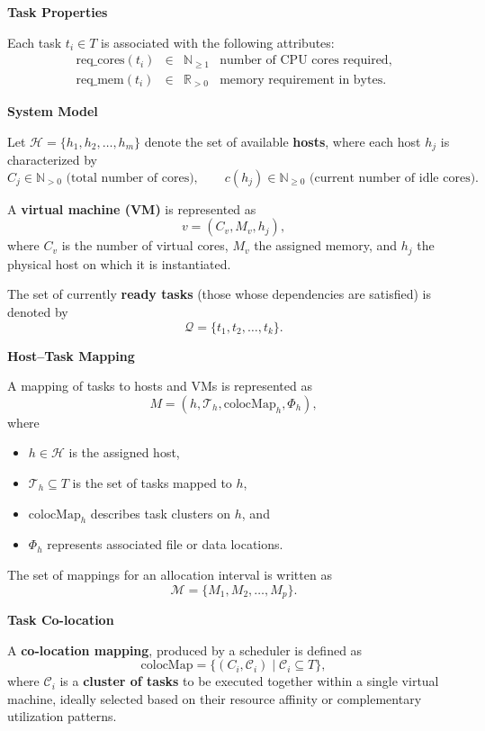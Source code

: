 \textbf{Task Properties}

Each task \( t_i \in T \) is associated with the following attributes:
\[
    \begin{array}{rcll}
        \text{req\_cores}(t_i) & \in & \mathbb{N}_{\ge 1} & \text{number of CPU cores required}, \\[4pt]
        \text{req\_mem}(t_i)   & \in & \mathbb{R}_{>0}    & \text{memory requirement in bytes.}
    \end{array}
\]

\textbf{System Model}

Let \( \mathcal{H} = \{h_1, h_2, \dots, h_m\} \) denote the set of available \textbf{hosts},
where each host \( h_j \) is characterized by
\[
    C_j \in \mathbb{N}_{>0} \text{ (total number of cores)}, \qquad
    c(h_j) \in \mathbb{N}_{\ge 0} \text{ (current number of idle cores).}
\]

A \textbf{virtual machine (VM)} is represented as
\[
    v = (C_v, M_v, h_j),
\]
where \( C_v \) is the number of virtual cores, \( M_v \) the assigned memory,
and \( h_j \) the physical host on which it is instantiated.

The set of currently \textbf{ready tasks} (those whose dependencies are satisfied) is denoted by
\[
    \mathcal{Q} = \{t_1, t_2, \dots, t_k\}.
\]

\textbf{Host--Task Mapping}

A mapping of tasks to hosts and VMs is represented as
\[
    M = (h, \mathcal{T}_h, \text{colocMap}_h, \Phi_h),
\]
where
\begin{itemize}
    \item $h \in \mathcal{H}$ is the assigned host,
    \item $\mathcal{T}_h \subseteq T$ is the set of tasks mapped to $h$,
    \item $\text{colocMap}_h$ describes task clusters on $h$, and
    \item $\Phi_h$ represents associated file or data locations.
\end{itemize}
The set of mappings for an allocation interval is written as
\[
    \mathcal{M} = \{ M_1, M_2, \dots, M_p \}.
\]

\textbf{Task Co-location}

A \textbf{co-location mapping}, produced by a scheduler is defined as
\[
    \text{colocMap} = \{ (C_i, \mathcal{C}_i) \mid \mathcal{C}_i \subseteq T \},
\]
where $\mathcal{C}_i$ is a \textbf{cluster of tasks} to be executed together within a single virtual machine, ideally selected based on their resource affinity or complementary utilization patterns.



